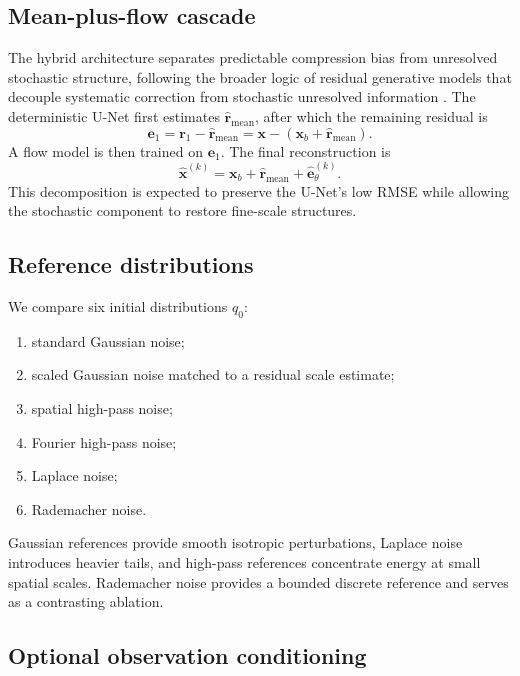 \documentclass[11pt]{article}
\newcommand{\x}{\mathbf{x}}
\newcommand{\xb}{\mathbf{x}_{b}}
\newcommand{\xh}{\widehat{\mathbf{x}}}
\newcommand{\rone}{\mathbf{r}_{1}}
\newcommand{\emean}{\widehat{\mathbf{r}}_{\mathrm{mean}}}
\newcommand{\eh}{\widehat{\mathbf{e}}_{\theta}}
\begin{document}
\subsection{Mean-plus-flow cascade}

The hybrid architecture separates predictable compression bias from unresolved stochastic structure, following the broader logic of residual generative models that decouple systematic correction from stochastic unresolved information \cite{ghouse2023residual,liu2024residual,ke2025ultra}. The deterministic U-Net first estimates $\emean$, after which the remaining residual is
\begin{equation}
\boxed{
    \mathbf{e}_1
    =
    \rone-\emean
    =
    \x-(\xb+\emean).
}
\end{equation}
A flow model is then trained on $\mathbf{e}_1$. The final reconstruction is
\begin{equation}
\boxed{
    \xh^{(k)}
    =
    \xb+\emean+\eh^{(k)}.
}
\label{eq:cascade}
\end{equation}
This decomposition is expected to preserve the U-Net's low RMSE while allowing the stochastic component to restore fine-scale structures.

\subsection{Reference distributions}

We compare six initial distributions $q_0$:
\begin{enumerate}[leftmargin=1.5em]
    \item standard Gaussian noise;
    \item scaled Gaussian noise matched to a residual scale estimate;
    \item spatial high-pass noise;
    \item Fourier high-pass noise;
    \item Laplace noise;
    \item Rademacher noise.
\end{enumerate}
Gaussian references provide smooth isotropic perturbations, Laplace noise introduces heavier tails, and high-pass references concentrate energy at small spatial scales. Rademacher noise provides a bounded discrete reference and serves as a contrasting ablation.

\subsection{Optional observation conditioning}
\end{document}
